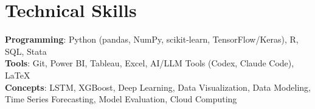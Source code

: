 \section{Technical Skills}
    \begin{itemize}[leftmargin=0in, label={}]
	\small{\item{\strut
		\textbf{Programming}{: Python (pandas, NumPy, scikit-learn, TensorFlow/Keras), R, SQL, Stata} \\
		\textbf{Tools}{: Git, Power BI, Tableau, Excel, AI/LLM Tools (Codex, Claude Code), LaTeX} \\
		\textbf{Concepts}{: LSTM, XGBoost, Deep Learning, Data Visualization, Data Modeling, Time Series Forecasting, Model Evaluation, Cloud Computing} \\
		
	}}
    \end{itemize}
